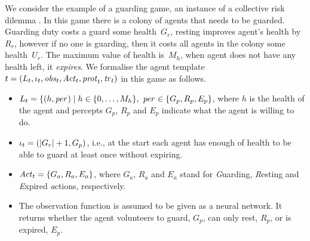 

\begin{example}\em
  \label{ex:agent-template}

  We consider the example of a guarding game, an instance of a collective risk
  dilemma \cite{MilinskiSKRM2008}. In this game there is a colony of agents
  that needs to be guarded. Guarding duty costs a guard some health~$G_r$,
  resting improves agent's health by $R_r$, however if no one is guarding, then
  it costs all agents in the colony some health~$U_r$. The maximum value of
  health is~$M_h$, when agent does not have any health left, it \emph{expires}.
%
  We formalise the agent template
  ${t} = \left ( L_{t}, \iota_{t}, \mathit{obs}_{t}, \mathit{Act}_{t}, \mathit{prot}_{t}, \mathit{tr}_{t}  \right )$
  in this game as follows.

 
  \begin{itemize}[$\bullet$]\itemsep 0cm
  \item
    $L_{t} = \{(h,\mathit{per}_{}) \mid h \in \{0,\dots,M_h\}, \ \mathit{per}_{} \in \{G_p,
    R_p, E_p\}$, where $h$ is the health of the agent and percepts $G_p$, $R_p$
    and $E_p$ indicate what the agent is willing to do.

  \item $\iota_{t} = (|G_r| + 1, G_p)$, i.e., at the start each agent has enough
    of health to be able to guard at least once without expiring.
    
  \item $\mathit{Act}_{t} = \{G_a, R_a, E_a\}$, where $G_a$, $R_a$ and $E_a$ stand for
    \emph{G}uarding, \emph{R}esting and \emph{E}xpired \emph{a}ctions,
    respectively.
  

  \item The observation function is assumed to be given as a neural network. It
    returns whether the agent volunteers to guard, $G_p$, can only rest, $R_p$, or
    is expired, $E_p$.

    

\end{itemize}
\end{example}
